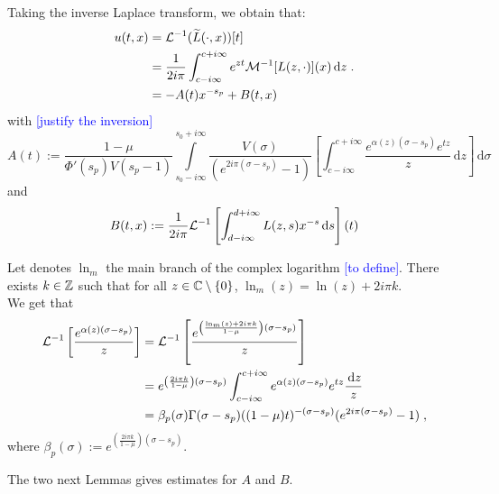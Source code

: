 \documentclass[11pt]{amsart}
\newcommand{\diff}{\,\mathrm{d}}
\newcommand{\ndr}[1]{\textcolor{blue}{[#1]}}
\begin{document}
Taking the inverse Laplace transform, we obtain that: 
\begin{align*}
     u(t,x) &= \Lcal^{-1}(\tilde L(\cdot, x))[t] \\
     &= \frac{1}{2i\pi } \int_{c-i\infty}^{c+i\infty} e^{zt}\Mcal^{-1}[L(z,\cdot)](x) \diff z
     \eqfinp\\
     &= -A(t)x^{-s_p} + B(t,x)
\end{align*}
with \ndr{justify the inversion}
\begin{equation}
    A(t) :=\frac{1-\mu}{\Phi'(s_p) V(s_p-1)}
     \int\limits_{s_0-i\infty}^{s_0+i\infty}
     \frac{V(\sigma)
  }{(e^{2i\pi(\sigma-s_p)}-1)} \left[\int_{c-i\infty}^{c+i\infty} \frac{e^{ \alpha(z)(\sigma-s_p)}e^{tz}}{z}\diff z \right] \diff \sigma
  \label{def:A} 
\end{equation}
and 
\begin{equation}
    B(t,x) := \frac{1}{2i\pi} \Lcal^{-1}\left[\int_{d-i\infty}^{d+i\infty} L(z,s)x^{-s}\diff s \right] (t)
\label{def:B}
\end{equation}

Let denotes $\ln_{m}$  the main branch of the complex logarithm \ndr{to define}. There exists $k \in \mathbb{Z}$ such that for all $z \in \mathbb{C} \setminus \{0\}$, $\ln_m(z) = \ln(z) + 2i\pi k. $ \\
We get that 
\begin{subequations}
\begin{align}
    \Lcal^{-1}\left[ \frac{e^{ \alpha(z)(\sigma-s_p)}}{z}  \right]
    &= 
    \Lcal^{-1}\left[ \frac{e^{ \left( \frac{\ln_m(z) + 2i\pi k}{1-\mu} \right) (\sigma-s_p)}}{z}  \right] \\
    &= 
    e^{ \left( \frac{2i\pi k}{1-\mu} \right) (\sigma-s_p)}
    \int_{c-i\infty}^{c+i\infty} e^{ \alpha(z)(\sigma-s_p)}e^{tz}\frac{\diff z}{z}\\
    &= \beta_p(\sigma) \Gamma(\sigma-s_p)((1-\mu)t)^{-(\sigma-s_p)}(e^{2i\pi(\sigma-s_p)}-1)
    \eqfinv
\end{align}
\label{eq:calcLaplInv}
\end{subequations}
where $\beta_p(\sigma) := e^{ \left( \frac{2i\pi k}{1-\mu} \right) (\sigma-s_p)}$. 

The two next Lemmas gives estimates for $A$ and $B$. 
\end{document}
